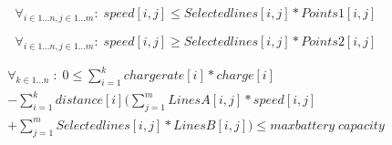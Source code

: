 \begin{equation}
\forall_{i\in1 \dots n, j \in 1 \dots m}:\; speed[i,j] \le Selectedlines[i,j] * Points1[i,j]
\end{equation}

\begin{equation}
\forall_{i\in1 \dots n, j \in 1 \dots m}:\; speed[i,j] \ge Selectedlines[i,j] * Points2[i,j]
\end{equation}

\begin{equation}
\begin{split}
\forall_{k\in1 \dots n}\;:\;0 \le\sum_{i=1}^{k}chargerate[i]*charge[i]\\
-\sum_{i=1}^{k} distance[i](\sum_{j=1}^{m} LinesA[i,j]*speed[i,j]\\
+\sum_{j=1}^{m} Selectedlines[i,j]*LinesB[i,j]) \le maxbattery\;capacity
\end{split}
\end{equation}

